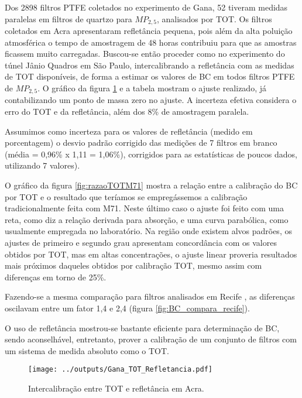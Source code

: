 Dos 2898 filtros PTFE coletados no experimento de Gana, 52 tiveram medidas 
paralelas em filtros de quartzo para $MP_{2,5}$, analisados por TOT.
Os filtros coletados em Acra apresentaram refletância pequena, pois além da 
alta poluição atmosférica o tempo de amostragem de 48 horas contribuiu para que
as amostras ficassem muito carregadas. Buscou-se então proceder como no 
experimento do túnel Jânio Quadros em São Paulo, intercalibrando a refletância 
com as medidas de TOT disponíveis, de forma a estimar os valores de BC em todos 
filtros PTFE de $MP_{2,5}$. O gráfico da figura \ref{fig:interGanaBC} e a 
tabela \label{table:interGanaBC} mostram o ajuste realizado, já contabilizando 
um ponto de massa zero no ajuste. A incerteza efetiva considera o erro do TOT 
e da refletância, além dos 8\% de amostragem paralela. 

Assumimos como incerteza para os valores de refletância (medido em porcentagem)
o desvio padrão corrigido das medições de 7 filtros em branco 
(média = 0,96\% x 1,11 = 1,06\%), corrigidos para as estatísticas de poucos 
dados, utilizando 7 valores). %

O gráfico da figura \ref{fig:razaoTOTM71} mostra a relação entre a calibração do 
BC por TOT e o resultado que teríamos se empregássemos a calibração 
tradicionalmente feita com M71. Neste último caso o ajuste foi feito com uma
reta, como diz a relação derivada para absorção, e uma curva parabólica, 
como usualmente empregada no laboratório. Na região onde existem alvos padrões, 
os ajustes de primeiro e segundo grau apresentam concordância com os valores 
obtidos por TOT, mas em altas concentrações, o ajuste linear proveria resultados
mais próximos daqueles obtidos por calibração TOT, mesmo assim com diferenças 
em torno de 25\%. 

Fazendo-se a mesma comparação para filtros analisados em Recife \citep{santos2014},
as diferenças oscilavam entre um fator 1,4 e 2,4 (figura \ref{fig:BC_compara_recife}).

O uso de refletância mostrou-se bastante eficiente para determinação de BC, 
sendo aconselhável, entretanto, prover a calibração de um conjunto de filtros 
com um sistema de medida absoluto como o TOT.


\begin{figure}[H]
	\begin{center}
		\texttt{[image: ../outputs/Gana\_TOT\_Refletancia.pdf]}
		\caption{Intercalibração entre TOT e refletância em Acra. \label{fig:interGanaBC}}
	\end{center}
\end{figure}

